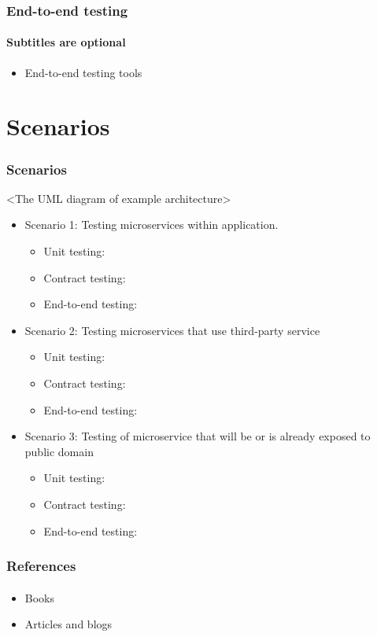 \documentclass{beamer}
\begin{document}
\begin{frame}
	\frametitle{End-to-end testing}
	\framesubtitle{Subtitles are optional}
	\begin{itemize}
 		 \item End-to-end testing tools
	\end{itemize}
\end{frame}

\section{Scenarios}
\begin{frame}
	\frametitle{Scenarios}
	<The UML diagram of example architecture>
	\begin{itemize}
 		 \item Scenario 1: Testing microservices within application. \\
			\begin{itemize}
 				 \item Unit testing:
				 \item Contract testing:
				 \item End-to-end testing:
			\end{itemize}	 
		 \item Scenario 2: Testing microservices that use third-party service
			\begin{itemize}
 				 \item Unit testing:
				 \item Contract testing:
				 \item End-to-end testing:
			\end{itemize}	
		 \item Scenario 3: Testing of microservice that will be or is already exposed to public domain
			\begin{itemize}
 				 \item Unit testing:
				 \item Contract testing:
				 \item End-to-end testing:
			\end{itemize}	
	\end{itemize}
\end{frame}

\begin{frame}
	\frametitle{References}
	\framesubtitle{}
	\begin{itemize}
 		 \item Books
		 \item Articles and blogs
	\end{itemize}
\end{frame}
\end{document}
